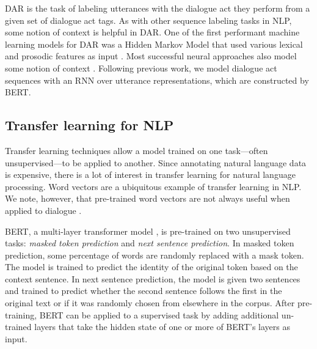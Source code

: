 \documentclass[11pt,a4paper]{article}
\begin{document}
DAR is the task of labeling utterances with the dialogue act they perform 
from a given set of dialogue act tags.
As with other sequence labeling tasks in NLP, some notion of context is helpful in DAR.
One of the first performant machine learning models for DAR was a Hidden Markov Model 
that used various lexical and prosodic features as input \citep{stolckeDialogueActModeling2000}.
Most successful neural approaches also model some notion of context \citep[e.g.,][]{kalchbrennerRecurrentConvolutionalNeural2013,tranHierarchicalNeuralModel2017,botheContextbasedApproachDialogue2018,bothe2018conversational,zhao2018unified}.
Following previous work, we model dialogue act sequences with an RNN over utterance representations,
which are constructed by BERT.

\subsection{Transfer learning for NLP}
Transfer learning techniques allow a model trained on one task---often unsupervised---to be applied to another. 
Since annotating natural language data is expensive, there is a lot of interest in transfer learning for natural language processing. 
Word vectors \citep[e.g.,][]{mikolovDistributedRepresentationsWords2013,penningtonGloveGlobalVectors2014} are a ubiquitous example of transfer learning in NLP.
We note, however, that pre-trained word vectors are not always useful when applied to dialogue \cite{cerisaraEffectsUsingWord2vec2017}. 

BERT, a multi-layer transformer model \citep{devlinBERTPretrainingDeep2018}, 
is pre-trained on two unsupervised tasks: 
\emph{masked token prediction} and \emph{next sentence prediction}.
In masked token prediction, some percentage of words are randomly replaced with a mask token.
The model is trained to predict the identity of the original token based on the context sentence.
In next sentence prediction, the model is given two sentences and trained to predict whether the second sentence follows the first in the original text or if it was randomly chosen from elsewhere in the corpus.
After pre-training, BERT can be applied to a supervised task by adding additional un-trained layers that take the hidden state of one or more of BERT's layers as input. 
\end{document}
